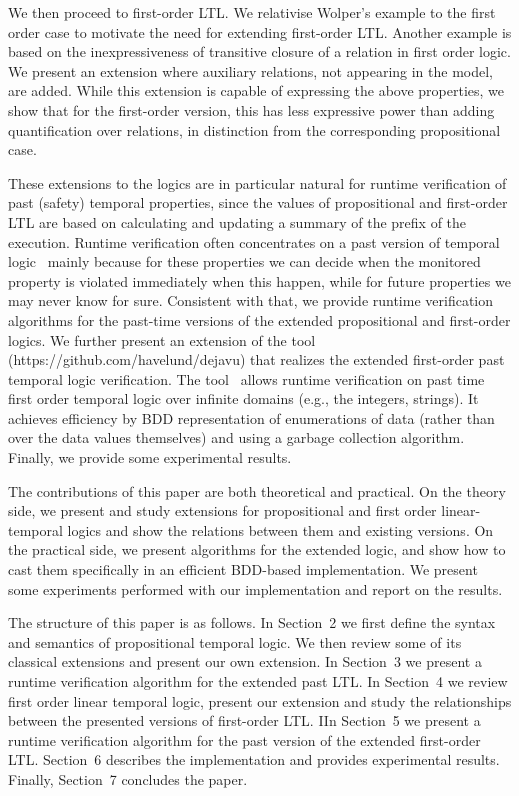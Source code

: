We then proceed to first-order LTL. We relativise Wolper's example to the first
order case to motivate the need for
extending first-order LTL. Another example is based on the inexpressiveness of transitive closure of a relation in first order logic.
We present an extension where auxiliary relations, not appearing in the model, are
added. While this extension
is capable of expressing the above
properties, we show that for the first-order version, this has less 
expressive power than adding quantification over relations, in distinction from the corresponding propositional case.

These extensions to the logics are in particular natural for
runtime verification of past (safety) temporal properties, since
the values of propositional and first-order LTL are based
on calculating and updating a summary of the prefix of the execution. Runtime verification often concentrates on a past  version of temporal logic~\cite{HR} mainly because for these properties we can decide when the monitored property is violated immediately when this happen, while for future properties we may never know for sure. Consistent with that, 
we provide runtime verification algorithms for the past-time versions of the extended propositional and first-order
logics. We further present an extension of the 
\dejavu{} tool (https://github.com/havelund/dejavu) that
realizes the extended first-order past temporal logic verification. The \dejavu{} tool~\cite{HPU,HP} allows runtime verification on past time first order temporal logic over infinite domains (e.g., the integers, strings). It achieves efficiency by BDD representation of enumerations of data (rather than over the data values themselves) and using
a garbage collection algorithm. 
Finally, we provide some experimental results.

The contributions of this paper are both theoretical and practical. On the theory side, we present and study extensions for propositional and first order linear-temporal logics and show the relations between them and existing versions. 
On the practical side, we present algorithms for the extended logic, and 
show how to cast them specifically in an efficient BDD-based implementation. We present some experiments performed with our implementation and report on the results. 

The structure of this paper is as follows. In Section~2 we first define the syntax and semantics of propositional temporal logic. We then review some of its classical extensions and present our own extension. In Section~3 we present a runtime verification algorithm for the extended past LTL. In Section~4 we review first order linear temporal logic, present our extension and study the relationships between the presented versions of first-order LTL. IIn Section~5 we present a runtime verification algorithm for the past version of the extended first-order LTL. Section~6 describes the implementation and provides experimental results. Finally, Section~7 concludes the paper.

